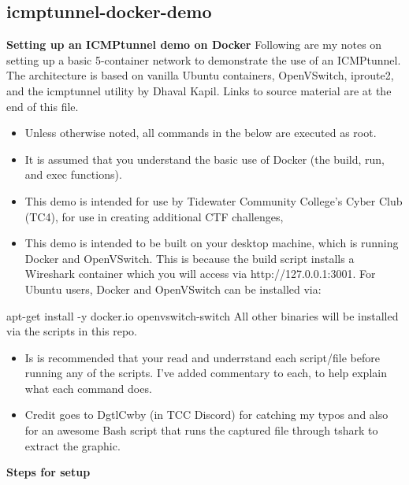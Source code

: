 \subsection*{icmptunnel-docker-demo}
\textbf{Setting up an ICMPtunnel demo on Docker}
Following are my notes on setting up a basic 5-container network to demonstrate the use of an ICMPtunnel. 
The architecture is based on vanilla Ubuntu containers, OpenVSwitch, iproute2, and the icmptunnel utility by Dhaval Kapil. 
Links to source material are at the end of this file.
\begin{itemize}
    \item Unless otherwise noted, all commands in the below are executed as root.
    \item It is assumed that you understand the basic use of Docker (the build, run, and exec functions).
    \item This demo is intended for use by Tidewater Community College's Cyber Club (TC4), for use in creating additional CTF challenges,
    \item This demo is intended to be built on your desktop machine, which is running Docker and OpenVSwitch. This is because the build script installs a Wireshark container which you will access via http://127.0.0.1:3001. For Ubuntu users, Docker and OpenVSwitch can be installed via:
\end{itemize}
apt-get install -y docker.io openvswitch-switch
\vspace{1ex} \newline
All other binaries will be installed via the scripts in this repo.
\begin{itemize}
    \item Is is recommended that your read and underrstand each script/file before running any of the scripts. I've added commentary to each, to help explain what each command does.
    \item Credit goes to DgtlCwby (in TCC Discord) for catching my typos and also for an awesome Bash script that runs the captured file through tshark to extract the graphic.
\end{itemize}
\vspace{2ex} 
\textbf{Steps for setup}
